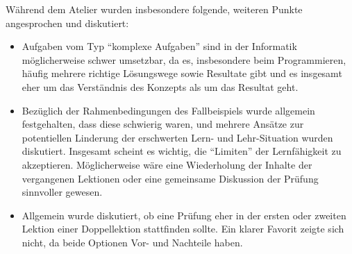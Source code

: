\begin{myExBox}[title=Persönliche Beantwortung der Fragestellungen]
  \begin{myExBox}[title=Inputs vom Atelier]
    Während dem Atelier wurden insbesondere folgende, weiteren Punkte angesprochen und diskutiert:
    \begin{itemize}
      \item Aufgaben vom Typ \enquote{komplexe Aufgaben} sind in der Informatik möglicherweise schwer umsetzbar, da es, insbesondere beim Programmieren, häufig mehrere richtige Lösungswege sowie Resultate gibt und es insgesamt eher um das Verständnis des Konzepts als um das Resultat geht.
      \item Bezüglich der Rahmenbedingungen des Fallbeispiels wurde allgemein festgehalten, dass diese schwierig waren, und mehrere Ansätze zur potentiellen Linderung der erschwerten Lern- und Lehr-Situation wurden diskutiert. Insgesamt scheint es wichtig, die \enquote{Limiten} der Lernfähigkeit zu akzeptieren. Möglicherweise wäre eine Wiederholung der Inhalte der vergangenen Lektionen oder eine gemeinsame Diskussion der Prüfung sinnvoller gewesen.
      \item Allgemein wurde diskutiert, ob eine Prüfung eher in der ersten oder zweiten Lektion einer Doppellektion stattfinden sollte. Ein klarer Favorit zeigte sich nicht, da beide Optionen Vor- und Nachteile haben.
    \end{itemize}
  \end{myExBox}

\end{myExBox}
